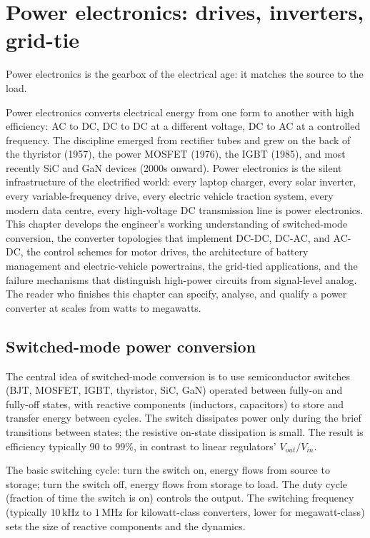\chapter{Power electronics: drives, inverters, grid-tie}
\label{vol08:ch09}

\epigraph{Power electronics is the gearbox of the electrical age: it matches the source to the load.}{}


\noindent
Power electronics converts electrical energy from one form to another with high efficiency: AC to DC, DC to DC at a different voltage, DC to AC at a controlled frequency. The discipline emerged from rectifier tubes and grew on the back of the thyristor (1957), the power MOSFET (1976), the IGBT (1985), and most recently SiC and GaN devices (2000s onward). Power electronics is the silent infrastructure of the electrified world: every laptop charger, every solar inverter, every variable-frequency drive, every electric vehicle traction system, every modern data centre, every high-voltage DC transmission line is power electronics. This chapter develops the engineer's working understanding of switched-mode conversion, the converter topologies that implement DC-DC, DC-AC, and AC-DC, the control schemes for motor drives, the architecture of battery management and electric-vehicle powertrains, the grid-tied applications, and the failure mechanisms that distinguish high-power circuits from signal-level analog. The reader who finishes this chapter can specify, analyse, and qualify a power converter at scales from watts to megawatts.

\section{Switched-mode power conversion}

The central idea of switched-mode conversion is to use semiconductor switches (BJT, MOSFET, IGBT, thyristor, SiC, GaN) operated between fully-on and fully-off states, with reactive components (inductors, capacitors) to store and transfer energy between cycles. The switch dissipates power only during the brief transitions between states; the resistive on-state dissipation is small. The result is efficiency typically $90$ to $99\%$, in contrast to linear regulators' $V_{out}/V_{in}$.

The basic switching cycle: turn the switch on, energy flows from source to storage; turn the switch off, energy flows from storage to load. The duty cycle (fraction of time the switch is on) controls the output. The switching frequency (typically $10\,\text{kHz}$ to $1\,\text{MHz}$ for kilowatt-class converters, lower for megawatt-class) sets the size of reactive components and the dynamics.

